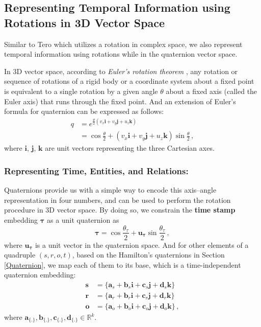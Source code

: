 \documentclass[11pt]{article}
\newcommand{\vect}[1]{\mathbf{#1}\xspace}
\newcommand{\vecti}{\vect{i}\xspace}
\newcommand{\vectj}{\vect{j}\xspace}
\newcommand{\vectk}{\vect{k}\xspace}
\newcommand{\vects}{\vect{s}\xspace}
\newcommand{\vectr}{\vect{r}\xspace}
\newcommand{\vecto}{\vect{o}\xspace}
\begin{document}
\subsection{Representing Temporal Information using Rotations in 3D Vector Space}
Similar to Tero \cite{xu2020tero} which utilizes a rotation in complex space, we also represent temporal information using rotations while in the quaternion vector space.

In 3D vector space, according to \emph{Euler's rotation theorem} \cite{euler1776novi,verhoeff2014euler}, any rotation or sequence of rotations of a rigid body or a coordinate system about a fixed point is equivalent to a single rotation by a given angle $\theta$ about a fixed axis (called the Euler axis) that runs through the fixed point.
And an extension of Euler's formula for quaternion can be expressed as follows:
\begin{equation}
\begin{aligned}
    q &= e^{\frac{\theta}{2} (v_x \vecti + v_y \vectj + u_z \vectk)} \\
    &= \cos \frac{\theta}{2} + (v_x \vecti + v_y \vectj + u_z \vectk) \sin \frac{\theta}{2} \, ,
\end{aligned}
\end{equation}
where $\vecti$, $\vectj$, $\vectk$ are unit vectors representing the three Cartesian axes.

\subsubsection{Representing Time, Entities, and Relations:}
Quaternions provide us with a simple way to encode this axis–angle representation in four numbers, and can be used to perform the rotation procedure in 3D vector space.
By doing so, we constrain the \textbf{time stamp} embedding $\pmb{\tau}$ as a unit quaternion as 
\begin{equation}\label{equation:tau}
    \pmb{\tau} = \cos \frac{{\theta}_{\tau}}{2} + \vect{u_{\tau}} \sin \frac{{\theta}_{\tau}}{2} \, ,
\end{equation}
where $\vect{u_{\tau}}$ is a unit vector in the quaternion space.
And for other elements of a quadruple $(s, r, o, t)$, based on the Hamilton's quaternions in Section \ref{Quaternion}, we map each of them to its base, which is a time-independent quaternion embedding:
\begin{align}
\vects & = \{ \vect{a}_s + \vect{b}_s \vecti + \vect{c}_s \vectj + \vect{d}_s \vectk \} \nonumber\\
\vectr & = \{ \vect{a}_r + \vect{b}_r \vecti + \vect{c}_r \vectj + \vect{d}_r \vectk \} \nonumber\\
\vecto & = \{ \vect{a}_o + \vect{b}_o \vecti + \vect{c}_o \vectj + \vect{d}_o \vectk \} \, ,
\end{align}
where $\vect{a}_{\{.\}},\vect{b}_{\{.\}},\vect{c}_{\{.\}},\vect{d}_{\{.\}} \in \mathbb{R}^{k}$.
\end{document}
